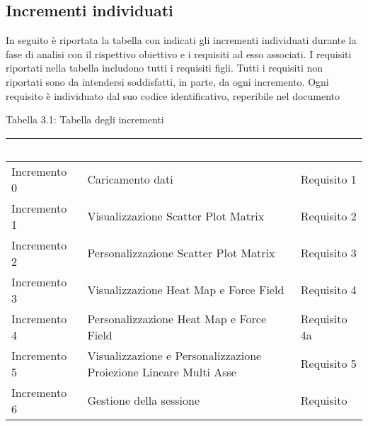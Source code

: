 \subsection{Incrementi individuati}
In seguito è riportata la tabella con indicati gli incrementi individuati durante la fase di analisi con il rispettivo obiettivo e i requisiti ad esso associati.
I requisiti riportati nella tabella includono tutti i requisiti figli. Tutti i requisiti non riportati sono da intendersi soddisfatti, in parte, da ogni incremento.
Ogni requisito è individuato dal suo codice identificativo, reperibile nel documento \AdR
\begin{center}
Tabella 3.1: Tabella degli incrementi
\end{center}
\begin{longtable}{C{3cm} C{5cm} C{3cm}}
\textcolor{white}{\textbf{Incremento}} & 
\textcolor{white}{\textbf{Obiettivo dell'incremento}} & 
\textcolor{white}{\textbf{Requisiti}}\\
\endhead

Incremento 0 & Caricamento dati & Requisito 1\\
Incremento 1 & Visualizzazione Scatter Plot Matrix & Requisito 2\\
Incremento 2 & Personalizzazione Scatter Plot Matrix & Requisito 3 \\
Incremento 3 & Visualizzazione Heat Map e Force Field & Requisito 4\\
Incremento 4 & Personalizzazione Heat Map e Force Field & Requisito 4a\\
Incremento 5 & Visualizzazione e Personalizzazione Proiezione Lineare Multi Asse & Requisito 5\\
Incremento 6 & Gestione della sessione & Requisito \\

\end{longtable}
